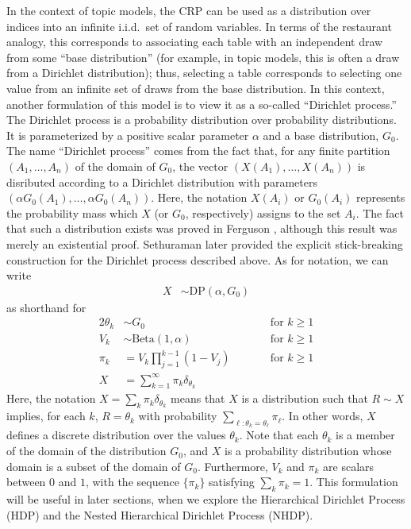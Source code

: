 \documentclass{article}
\begin{document}
In the context of topic models, the CRP can be used as a distribution over indices into an infinite i.i.d.\ set of random variables.
In terms of the restaurant analogy, this corresponds to associating each table with an independent draw from some ``base distribution'' (for example, in topic models, this is often a draw from a Dirichlet distribution); thus, selecting a table corresponds to selecting one value from an infinite set of draws from the base distribution.
In this context, another formulation of this model is to view it as a so-called ``Dirichlet process.''
The Dirichlet process is a probability distribution over probability distributions.
It is parameterized by a positive scalar parameter $\alpha$ and a base distribution, $G_0$.
The name ``Dirichlet process'' comes from the fact that, for any finite partition $(A_1, \ldots, A_n)$ of the domain of $G_0$, the vector $(X(A_1), \ldots, X(A_n))$ is disributed according to a Dirichlet distribution with parameters $(\alpha G_0(A_1), \ldots, \alpha G_0(A_n))$.
Here, the notation $X(A_i)$ or $G_0(A_i)$ represents the probability mass which $X$ (or $G_0$, respectively) assigns to the set $A_i$.
The fact that such a distribution exists was proved in Ferguson \cite{ferguson1973bayesian}, although this result was merely an existential proof.
Sethuraman \cite{sethuraman1994constructive} later provided the explicit stick-breaking construction for the Dirichlet process described above.
As for notation, we can write
\begin{align}
X &\sim \text{DP}(\alpha, G_0)
\end{align}
as shorthand for
\begin{alignat}{2}
\theta_k &\sim G_0 &\qquad& \text{for $k \geq 1$} \\
V_k &\sim \text{Beta}(1, \alpha) &\qquad& \text{for $k \geq 1$} \\
\pi_k &= V_k \prod_{j=1}^{k-1} (1 - V_j) &\qquad& \text{for $k \geq 1$} \\
X &= \sum_{k=1}^\infty \pi_k \delta_{\theta_k} &&
\end{alignat}
Here, the notation $X = \sum_k \pi_k \delta_{\theta_k}$ means that $X$ is a distribution such that $R \sim X$ implies, for each $k$, $R = \theta_k$ with probability $\sum_{\ell : \theta_k = \theta_\ell} \pi_\ell$.
In other words, $X$ defines a discrete distribution over the values $\theta_k$.
Note that each $\theta_k$ is a member of the domain of the distribution $G_0$, and $X$ is a probability distribution whose domain is a subset of the domain of $G_0$.
Furthermore, $V_k$ and $\pi_k$ are scalars between $0$ and $1$, with the sequence $\{\pi_k\}$ satisfying $\sum_k \pi_k = 1$.
This formulation will be useful in later sections, when we explore the Hierarchical Dirichlet Process (HDP) and the Nested Hierarchical Dirichlet Process (NHDP).
\end{document}
